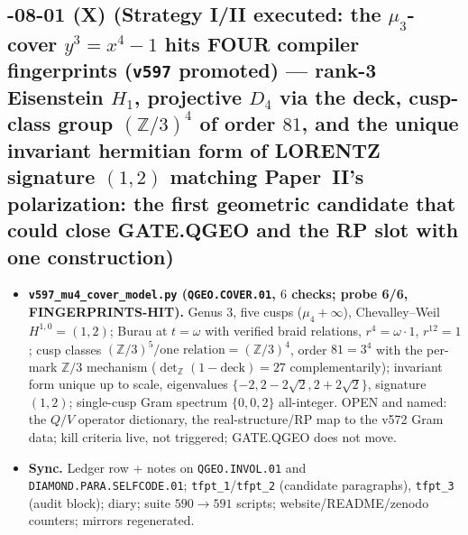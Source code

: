\subsection*{-08-01 (X) (Strategy I/II executed: the $\mu_3$-cover $y^3=x^4-1$ hits FOUR compiler fingerprints (\texttt{v597} promoted) --- rank-3 Eisenstein $H_1$, projective $D_4$ via the deck, cusp-class group $(\mathbb{Z}/3)^4$ of order $81$, and the unique invariant hermitian form of LORENTZ signature $(1,2)$ matching Paper~II's polarization: the first geometric candidate that could close GATE.QGEO and the RP slot with one construction)}
\begin{itemize}[leftmargin=1.5em]
\item \textbf{\texttt{v597\_mu4\_cover\_model.py} (\texttt{QGEO.COVER.01}, $6$ checks;
probe 6/6, FINGERPRINTS-HIT).} Genus $3$, five cusps ($\mu_4+\infty$), Chevalley--Weil
$H^{1,0}=(1,2)$; Burau at $t=\omega$ with verified braid relations, $r^4=\omega\cdot1$,
$r^{12}=1$; cusp classes $(\mathbb{Z}/3)^5/\text{one relation}=(\mathbb{Z}/3)^4$, order
$81=3^4$ with the per-mark $\mathbb{Z}/3$ mechanism ($\det_{\mathbb{Z}}(1-\text{deck})=27$
complementarily); invariant form unique up to scale, eigenvalues $\{-2, 2{-}2\sqrt2,
2{+}2\sqrt2\}$, signature $(1,2)$; single-cusp Gram spectrum $\{0,0,2\}$ all-integer.
OPEN and named: the $Q/V$ operator dictionary, the real-structure/RP map to the v572 Gram
data; kill criteria live, not triggered; GATE.QGEO does not move.
\item \textbf{Sync.} Ledger row + notes on \texttt{QGEO.INVOL.01} and
\texttt{DIAMOND.PARA.SELFCODE.01}; \texttt{tfpt\_1}/\texttt{tfpt\_2} (candidate
paragraphs), \texttt{tfpt\_3} (audit block); diary; suite $590\to591$ scripts;
website/README/zenodo counters; mirrors regenerated.
\end{itemize}

